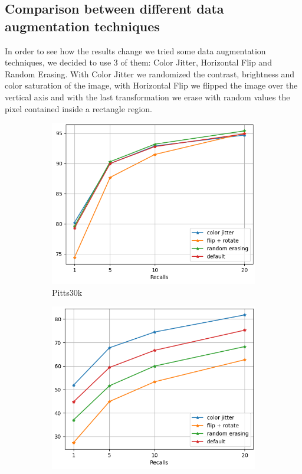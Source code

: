 \documentclass[10pt,twocolumn,letterpaper]{article}
\begin{document}
\subsection{Comparison between different data augmentation techniques}
In order to see how the results change we tried some data augmentation techniques, we decided to use 3 of them: Color Jitter, Horizontal Flip and Random Erasing. With Color Jitter we randomized the contrast, brightness and color saturation of the image, with Horizontal Flip we flipped the image over the vertical axis and with the last transformation we erase with random values the pixel contained inside a rectangle region.
\begin{figure}
   \centering
   \begin{subfigure}[b]{0.23\textwidth}
      \centering
      \includegraphics[width=\textwidth]{img/augment/test_pitts30k_recalls_graph.png}
      \caption{Pitts30k}
      \label{fig:recalls:augment:pitts30k}
   \end{subfigure}
   \hfill
   \begin{subfigure}[b]{0.23\textwidth}
      \centering
      \includegraphics[width=\textwidth]{img/augment/test_st_lucia_recalls_graph.png}

\end{subfigure}
\end{figure}
\end{document}
